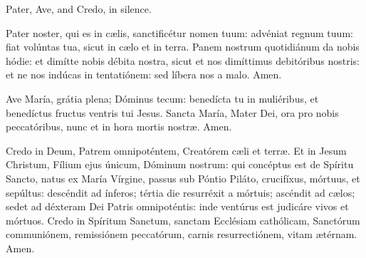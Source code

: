 \documentclass[12pt,a5paper,openany]{memoir}
\begin{document}
\switchcolumn



\switchcolumn*
{}

Pater, Ave, and Credo, in silence.

\switchcolumn


\switchcolumn*

Pater noster, qui es in cælis, sanctificétur nomen tuum: advéniat regnum tuum: fiat volúntas tua, sicut in cælo et in terra. Panem nostrum quotidiánum da nobis hódie: et dimítte nobis débita nostra, sicut et nos dimíttimus debitóribus nostris: et ne nos indúcas in tentatiónem: sed líbera nos a malo. Amen.

\switchcolumn


\switchcolumn*

Ave María, grátia plena; Dóminus tecum: benedícta tu in muliéribus, et benedíctus fructus ventris tui Jesus. Sancta María, Mater Dei, ora pro nobis peccatóribus, nunc et in hora mortis nostræ. Amen.


\switchcolumn


\switchcolumn*

Credo in Deum, Patrem omnipoténtem, Creatórem cæli et terræ. Et in Jesum Christum, Fílium ejus únicum, Dóminum nostrum: qui concéptus est de Spíritu Sancto, natus ex María Vírgine, passus sub Póntio Piláto, crucifíxus, mórtuus, et sepúltus: descéndit ad ínferos; tértia die resurréxit a mórtuis; ascéndit ad cælos; sedet ad déxteram Dei Patris omnipoténtis: inde ventúrus est judicáre vivos et mórtuos. Credo in Spíritum Sanctum, sanctam Ecclésiam cathólicam, Sanctórum communiónem, remissiónem peccatórum, carnis resurrectiónem, vitam ætérnam. Amen.
\switchcolumn
\end{document}

